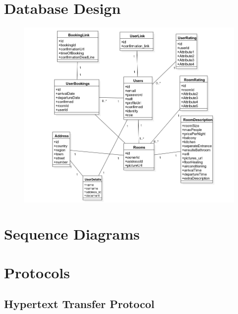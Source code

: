 \section{Database Design}
	\begin{figure}
		\includegraphics[scale=0.6]{./img/starUml.jpg} 
	\end{figure}
\section{Sequence Diagrams}
\section{Protocols}
\subsection*{Hypertext Transfer Protocol}

